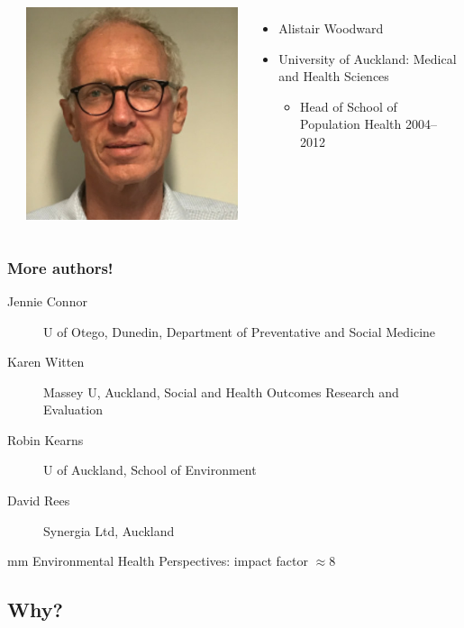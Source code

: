 \documentclass{beamer}
\begin{document}
\begin{frame}
\begin{columns}
\begin{itemize}
    \end{itemize}
    \includegraphics[height=0.3\textheight]{AlistairWoodward.jpg}
    \begin{itemize}
    \item Alistair Woodward
    \item University of Auckland: Medical and Health Sciences
      \begin{itemize}
      \item Head of School of Population Health 2004--2012
      \end{itemize}
    \end{itemize}
  \end{columns}
\end{frame}

\begin{frame}
  \frametitle{More authors!}
  \begin{description}
  \item[Jennie Connor] U of Otego, Dunedin, Department of Preventative and Social Medicine
  \item[Karen Witten] Massey U, Auckland, Social and Health Outcomes Research and Evaluation
  \item[Robin Kearns] U of Auckland, School of Environment
  \item[David Rees] Synergia Ltd, Auckland
  \end{description}
   mm
  Environmental Health Perspectives: impact factor $\approx 8$
\end{frame}

\subsection{Why?}
\end{document}
